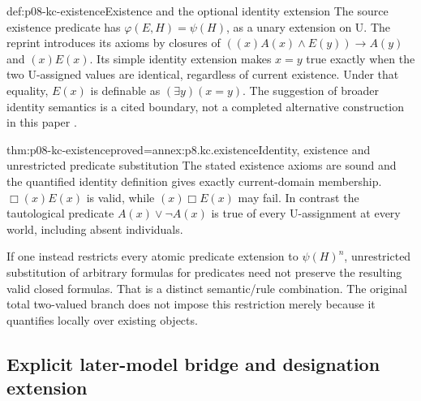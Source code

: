 \begin{hbdefinition}{def:p08-kc-existence}{Existence and the optional identity extension}
The source existence predicate has
\(\varphi(E,H)=\psi(H)\), as a unary extension on U.
The reprint introduces its axioms by closures of
\(((x)A(x)\land E(y))\to A(y)\) and \((x)E(x)\).
Its simple identity extension makes \(x=y\) true exactly when
the two U-assigned values are identical, regardless of current existence.
Under that equality, \(E(x)\) is definable as \((\exists y)(x=y)\).
The suggestion of broader identity semantics is a cited boundary,
not a completed alternative construction in this paper
\cite[p.~70]{Kripke1971ConsiderationsReprint}.
\end{hbdefinition}

\begin{hbtheorem}{thm:p08-kc-existence}{proved=annex:p8.kc.existence}{Identity, existence and unrestricted predicate substitution}
The stated existence axioms are sound and the quantified identity
definition gives exactly current-domain membership. \(\Box(x)E(x)\)
is valid, while \((x)\Box E(x)\) may fail. In contrast the
tautological predicate \(A(x)\lor\neg A(x)\) is true of every
U-assignment at every world, including absent individuals.

If one instead restricts every atomic predicate extension to
\(\psi(H)^n\), unrestricted substitution of arbitrary formulas for
predicates need not preserve the resulting valid closed formulas.
That is a distinct semantic/rule combination. The original total
two-valued branch does not impose this restriction merely because
it quantifies locally over existing objects.
\end{hbtheorem}

\subsection{Explicit later-model bridge and designation extension}

